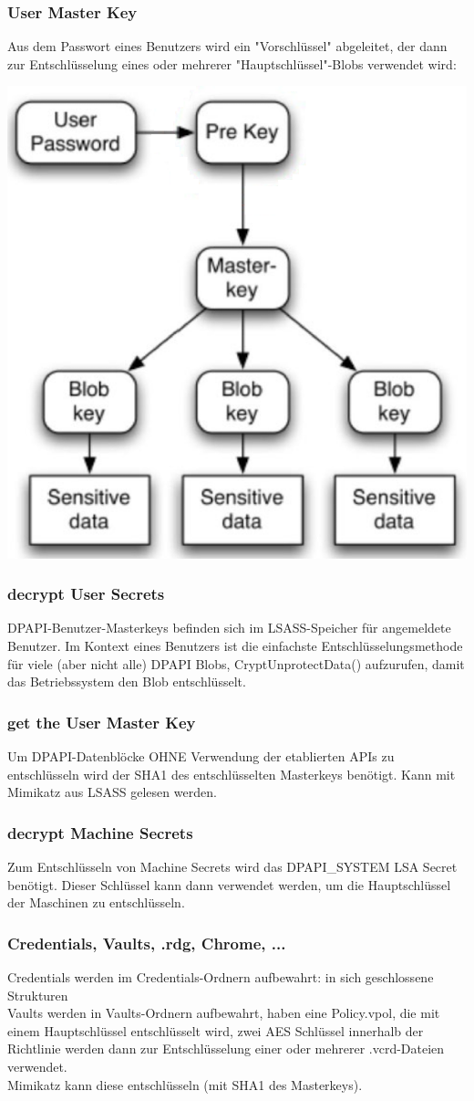 \subsubsection{User Master Key}
Aus dem Passwort eines Benutzers wird ein "Vorschlüssel" abgeleitet, der dann zur Entschlüsselung eines oder mehrerer "Hauptschlüssel"-Blobs verwendet wird:
\begin{center}
    \vspace{-8pt}
    \includegraphics[width=.4\linewidth]{./img/05-mimikatz/dpapi_master_key}
    \vspace{-8pt}
\end{center}

\subsubsection{decrypt User Secrets}
DPAPI-Benutzer-Masterkeys befinden sich im LSASS-Speicher für angemeldete Benutzer. Im Kontext eines Benutzers ist die einfachste Entschlüsselungsmethode für viele (aber nicht alle) DPAPI Blobs, CryptUnprotectData() aufzurufen, damit das Betriebssystem den Blob entschlüsselt.

\subsubsection{get the User Master Key}
Um DPAPI-Datenblöcke OHNE Verwendung der etablierten APIs zu entschlüsseln wird der SHA1 des entschlüsselten Masterkeys benötigt. Kann mit Mimikatz aus LSASS gelesen werden.

\subsubsection{decrypt Machine Secrets}
Zum Entschlüsseln von Machine Secrets wird das DPAPI\_SYSTEM LSA Secret benötigt. Dieser Schlüssel kann dann verwendet werden, um die Hauptschlüssel der Maschinen zu entschlüsseln.

\subsubsection{Credentials, Vaults, .rdg, Chrome, ...}
Credentials werden im Credentials-Ordnern aufbewahrt: in sich geschlossene Strukturen\\
Vaults werden in Vaults-Ordnern aufbewahrt, haben eine Policy.vpol, die mit einem Hauptschlüssel entschlüsselt wird, zwei AES Schlüssel innerhalb der Richtlinie werden dann zur Entschlüsselung einer oder mehrerer .vcrd-Dateien verwendet.\\
Mimikatz kann diese entschlüsseln (mit SHA1 des Masterkeys). %

